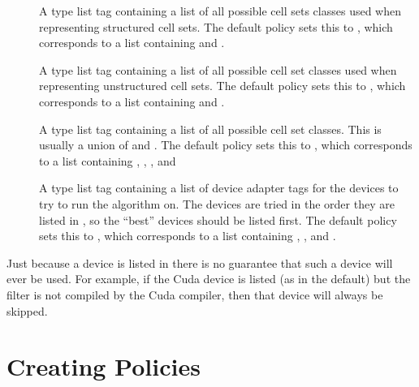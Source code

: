 \begin{description}
\item[] 
  A type list tag containing a list of all possible cell sets classes used when representing structured cell sets.
  The default policy sets this to , which corresponds to a list containing  and .
\item[] 
  A type list tag containing a list of all possible cell set classes used when representing unstructured cell sets.
  The default policy sets this to , which corresponds to a list containing  and .
\item[] 
  A type list tag containing a list of all possible cell set classes.
  This is usually a union of  and .
  The default policy sets this to , which corresponds to a list containing , , , and 
\item[] 
  A type list tag containing a list of device adapter tags for the devices to try to run the algorithm on.
  The devices are tried in the order they are listed in , so the ``best'' devices should be listed first.
  The default policy sets this to , which corresponds to a list containing , , and .
\end{description}

\begin{commonerrors}
  Just because a device is listed in  there is no guarantee that such a device will ever be used.
  For example, if the Cuda device is listed (as in the default) but the filter is not compiled by the Cuda compiler, then that device will always be skipped.
\end{commonerrors}


\section{Creating Policies}

